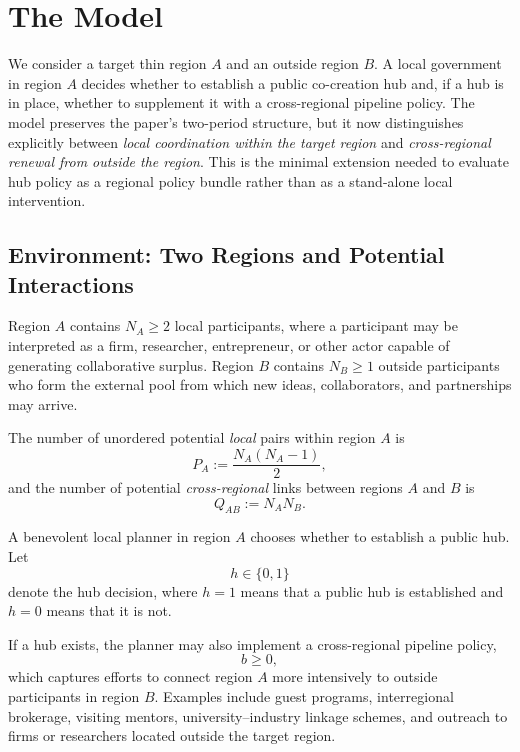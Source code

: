 \section{The Model}
\label{sec:model}

We consider a target thin region $A$ and an outside region $B$. A local government in region $A$ decides whether to establish a public co-creation hub and, if a hub is in place, whether to supplement it with a cross-regional pipeline policy. The model preserves the paper's two-period structure, but it now distinguishes explicitly between \emph{local coordination within the target region} and \emph{cross-regional renewal from outside the region}. This is the minimal extension needed to evaluate hub policy as a regional policy bundle rather than as a stand-alone local intervention.

\subsection{Environment: Two Regions and Potential Interactions}

Region $A$ contains $N_A \ge 2$ local participants, where a participant may be interpreted as a firm, researcher, entrepreneur, or other actor capable of generating collaborative surplus. Region $B$ contains $N_B \ge 1$ outside participants who form the external pool from which new ideas, collaborators, and partnerships may arrive.

The number of unordered potential \emph{local} pairs within region $A$ is
\begin{equation}
P_A := \frac{N_A(N_A-1)}{2},
\label{eq:pair_count}
\end{equation}
and the number of potential \emph{cross-regional} links between regions $A$ and $B$ is
\begin{equation}
Q_{AB} := N_A N_B.
\label{eq:cross_pair_count}
\end{equation}

A benevolent local planner in region $A$ chooses whether to establish a public hub. Let
\[
h \in \{0,1\}
\]
denote the hub decision, where $h=1$ means that a public hub is established and $h=0$ means that it is not.

If a hub exists, the planner may also implement a cross-regional pipeline policy,
\[
b \ge 0,
\]
which captures efforts to connect region $A$ more intensively to outside participants in region $B$. Examples include guest programs, interregional brokerage, visiting mentors, university--industry linkage schemes, and outreach to firms or researchers located outside the target region.

